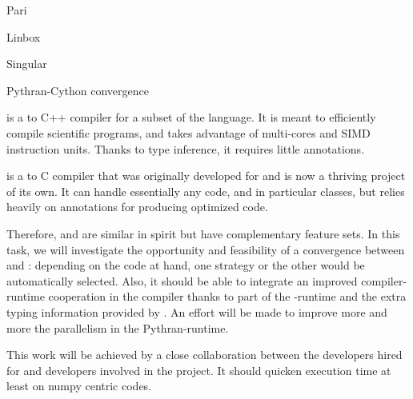 \begin{Workpackage}{\thewpno}
\begin{task}{Pari}
  \label{task:hpc_pari}

\end{task}

\begin{task}{Linbox}
  \label{task:hpc_linbox}

\end{task}

\begin{task}{Singular}
  \label{task:hpc_singular}

\end{task}


\begin{task}{Pythran-Cython convergence}
  \label{task:pythran_cython}

  \Pythran is a \Python to C++ compiler for a subset of the \Python
  language. It is meant to efficiently compile scientific programs,
  and takes advantage of multi-cores and SIMD instruction units.
  Thanks to type inference, it requires little annotations.

  \Cython is a \Python to C compiler that was originally developed for
  \Sage and is now a thriving project of its own. It can handle
  essentially any \Python code, and in particular classes, but relies
  heavily on annotations for producing optimized code.

  Therefore, \Pythran and \Cython are similar in spirit but have
  complementary feature sets. In this task, we will investigate the
  opportunity and feasibility of a convergence between \Cython and
  \Pythran: depending on the code at hand, one strategy or the other
  would be automatically selected. Also, it should be able to integrate an
  improved compiler-runtime cooperation in the \Cython compiler thanks to
  part of the \Pythran-runtime and the extra typing information provided by
  \Cython. An effort will be made to improve more and more the parallelism in
  the Pythran-runtime.

  This work will be achieved by a close collaboration between the
  \Pythran developers hired for \TheProject and \Cython developers
  involved in the \Sage project. It should quicken \Sage execution time at least
  on numpy centric codes.


\end{task}
\end{Workpackage}

